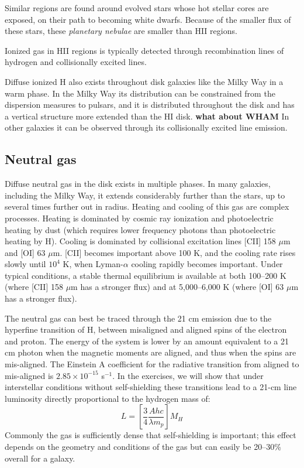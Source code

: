 Similar regions are found around evolved stars whose hot stellar cores
are exposed, on their path to becoming white dwarfs. Because of the
smaller flux of these stars, these {\it planetary nebulae} are smaller
than HII regions.

Ionized gas in HII regions is typically detected through recombination
lines of hydrogen and collisionally excited lines.

Diffuse ionized H also exists throughout disk galaxies like the Milky
Way in a warm phase. In the Milky Way its distribution can be
constrained from the dispersion measures to pulsars, and it is
distributed throughout the disk and has a vertical structure more
extended than the HI disk. {\bf what about WHAM} In other galaxies it
can be observed through its collisionally excited line emission.

\subsection{Neutral gas}

Diffuse neutral gas in the disk exists in multiple phases. In many
galaxies, including the Milky Way, it extends considerably further
than the stars, up to several times further out in radius.  Heating
and cooling of this gas are complex processes. Heating is dominated by
cosmic ray ionization and photoelectric heating by dust (which
requires lower frequency photons than photoelectric heating by
H). Cooling is dominated by collisional excitation lines [CII] 158
$\mu$m and [OI] 63 $\mu$m. [CII] becomes important above 100 K, and
the cooling rate rises slowly until $10^4$ K, when Lyman-$\alpha$
cooling rapidly becomes important. Under typical conditions, a stable
thermal equilibrium is available at both 100--200 K (where [CII] 158
$\mu$m has a stronger flux) and at 5,000--6,000 K (where [OI] 63
$\mu$m has a stronger flux).

The neutral gas can best be traced through the 21 cm emission due to
the hyperfine transition of H, between misaligned and aligned spins of
the electron and proton. The energy of the system is lower by an
amount equivalent to a 21 cm photon when the magnetic moments are
aligned, and thus when the spins are mis-aligned. The Einstein A
coefficient for the radiative transition from aligned to mis-aligned
is $2.85\times 10^{-15}$ s$^{-1}$. In the exercises, we will show that
under interstellar conditions without self-shielding these transitions
lead to a 21-cm line luminosity directly proportional to the hydrogen
mass of:
\begin{equation}
\label{eq:hi}
L = \left[ \frac{3}{4} \frac{A hc} {\lambda m_p} \right] M_H
\end{equation}
Commonly the gas is sufficiently dense that self-shielding is
important; this effect depends on the geometry and conditions of the
gas but can easily be 20--30\% overall for a galaxy.


